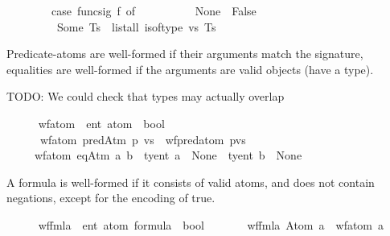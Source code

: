 \begin{isabellebody}
\ \ \ \ \ \ \ \ case\ func{\isacharunderscore}{\kern0pt}sig\ f\ of\isanewline
\ \ \ \ \ \ \ \ \ \ None\ {\isasymRightarrow}\ False\isanewline
\ \ \ \ \ \ \ \ {\isacharbar}{\kern0pt}\ Some\ Ts\ {\isasymRightarrow}\ list{\isacharunderscore}{\kern0pt}all{}\ is{\isacharunderscore}{\kern0pt}of{\isacharunderscore}{\kern0pt}type\ vs\ Ts{\isacharparenright}{\kern0pt}{\isachardoublequoteclose}%
\begin{isamarkuptext}%
Predicate-atoms are well-formed if their arguments match the
      signature, equalities are well-formed if the arguments are valid
      objects (have a type).

      TODO: We could check that types may actually overlap%
\end{isamarkuptext}\isamarkuptrue%
\ \ \ \ \isamarkupfalse%
\ wf{\isacharunderscore}{\kern0pt}atom\ {\isacharcolon}{\kern0pt}{\isacharcolon}{\kern0pt}\ {\isachardoublequoteopen}{\isacharprime}{\kern0pt}ent\ atom\ {\isasymRightarrow}\ bool{\isachardoublequoteclose}\ \isanewline
\ \ \ \ \ \ {\isachardoublequoteopen}wf{\isacharunderscore}{\kern0pt}atom\ {\isacharparenleft}{\kern0pt}predAtm\ p\ vs{\isacharparenright}{\kern0pt}\ {\isasymlongleftrightarrow}\ wf{\isacharunderscore}{\kern0pt}pred{\isacharunderscore}{\kern0pt}atom\ {\isacharparenleft}{\kern0pt}p{\isacharcomma}{\kern0pt}vs{\isacharparenright}{\kern0pt}{\isachardoublequoteclose}\isanewline
\ \ \ \ {\isacharbar}{\kern0pt}\ {\isachardoublequoteopen}wf{\isacharunderscore}{\kern0pt}atom\ {\isacharparenleft}{\kern0pt}eqAtm\ a\ b{\isacharparenright}{\kern0pt}\ {\isasymlongleftrightarrow}\ ty{\isacharunderscore}{\kern0pt}ent\ a\ {\isasymnoteq}\ None\ {\isasymand}\ ty{\isacharunderscore}{\kern0pt}ent\ b\ {\isasymnoteq}\ None{\isachardoublequoteclose}%
\begin{isamarkuptext}%
A formula is well-formed if it consists of valid atoms,
      and does not contain negations, except for the encoding \isa{\isactrlbold {\isasymnot}{\isasymbottom}} of true.%
\end{isamarkuptext}\isamarkuptrue%
\ \ \ \ \isamarkupfalse%
\ wf{\isacharunderscore}{\kern0pt}fmla\ {\isacharcolon}{\kern0pt}{\isacharcolon}{\kern0pt}\ {\isachardoublequoteopen}{\isacharparenleft}{\kern0pt}{\isacharprime}{\kern0pt}ent\ atom{\isacharparenright}{\kern0pt}\ formula\ {\isasymRightarrow}\ bool{\isachardoublequoteclose}\ \isanewline
\ \ \ \ \ \ {\isachardoublequoteopen}wf{\isacharunderscore}{\kern0pt}fmla\ {\isacharparenleft}{\kern0pt}Atom\ a{\isacharparenright}{\kern0pt}\ {\isasymlongleftrightarrow}\ wf{\isacharunderscore}{\kern0pt}atom\ a{\isachardoublequoteclose}\isanewline

\end{isabellebody}
